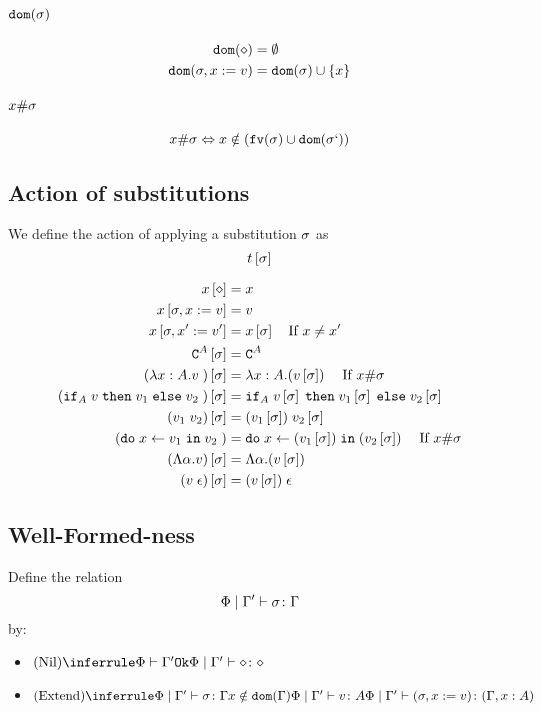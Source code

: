 {\paragraph{$\texttt{dom}(\sigma)$}
\begin{align}
    \texttt{dom}(\diamond) & = \emptyset\\
    \texttt{dom}(\sigma, x:= v) & = \texttt{dom}(\sigma)\cup\left\{x\right\}
\end{align}

\paragraph{$x \# \sigma$}
\begin{equation}
    x \# \sigma \Leftrightarrow x\notin(\texttt{fv}(\sigma)\cup\texttt{dom}(\sigma`))
\end{equation}

\subsection{Action of substitutions}
    We define the action of applying a substitution $\sigma$ as 
    $$t\left[\sigma\right]$$

    
    \begin{align}
        x\left[\diamond\right] & = x \\
        x\left[\sigma,x:= v\right] & = v \\
        x\left[\sigma,x':= v'\right] & = x\left[\sigma\right]\quad\text{If }x \neq x'\\
        \texttt{C}^{A}\left[\sigma\right] & = \texttt{C}^{A} \\
        (\lambda x : A. v\;)\left[\sigma\right] &= \lambda x : A. (v\left[\sigma\right])\;\quad\text{If }x\#\sigma\\
        (\texttt{if}_{A}\; v\; \texttt{then}\; v_1 \;\texttt{else} \; v_2\;)\left[\sigma\right] &= \texttt{if}_{A}\; v\left[\sigma\right]\; \texttt{then}\; v_1\left[\sigma\right] \;\texttt{else} \; v_2\left[\sigma\right]\;\\
        (v_1\; v_2)\left[\sigma\right]&= (v_1\left[\sigma\right])\; v_2\left[\sigma\right]\\
        (\texttt{do}\; x \leftarrow v_1 \;\texttt{in}\; v_2\;)&= \texttt{do}\; x \leftarrow (v_1\left[\sigma\right]) \;\texttt{in}\; (v_2\left[\sigma\right])\;\quad\text{If } x\#\sigma\\
        (\Lambda \alpha. v)\left[\sigma\right] & = \Lambda \alpha. (v\left[\sigma\right])\\
        (v\;\epsilon)\left[\sigma\right] & = (v\left[\sigma\right])\;\epsilon\\
    \end{align}
    \subsection{Well-Formed-ness}
Define the relation $$\Phi\mid\Gamma' \vdash \sigma \colon \Gamma$$ by:

\begin{itemize}
    \item $\ntreeruleI{Nil}{\wellformedok{\P}{\G'}}{\etyperelation{\P}{\G'}{\nil}{\nil}}$
    \item $\ntreeruleIII{Extend}{
        \etyperelation{\P}{\G'}{\si}{\G}
        }{
        x\notin\dom{\G}
        }{
        \etyperelation{\P}{\G'}{v}{A}
    }{
        \etyperelation{\P}{\G'}{(\si, x \setto v)}{(\gax)}
    }$
\end{itemize}
}
